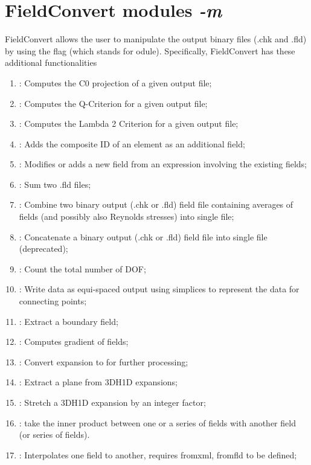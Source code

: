 \section{FieldConvert modules \textit{-m}}
FieldConvert allows the user to manipulate the \nekpp output
binary files (.chk and .fld) by using the flag  (which
stands for odule).
Specifically, FieldConvert has these additional functionalities
%
\begin{enumerate}
\item {}: Computes the C0 projection of a given output file;
\item {}: Computes the Q-Criterion for a given output file;
\item {}: Computes the Lambda 2 Criterion for a given output file;
\item {}: Adds the composite ID of an element as an additional field;
\item {}: Modifies or adds a new field from an expression involving the existing fields;
\item {}: Sum two .fld files;
\item {}: Combine two \nekpp binary output (.chk or .fld) field file containing averages of fields (and
possibly also Reynolds stresses) into single file;
\item {}: Concatenate a \nekpp binary output (.chk or .fld) field file into single file (deprecated);
\item {}: Count the total number of DOF;
\item {}: Write data as equi-spaced output using simplices to represent the data for connecting points;
\item {}: Extract a boundary field;
\item {}: Computes gradient of fields;
\item {}: Convert  expansion to  for further processing;
\item {}: Extract a plane from 3DH1D expansions;
\item {}: Stretch a 3DH1D expansion by an integer factor;
\item {}: take the inner product between one or a series of fields with another field (or series of fields).
\item {}: Interpolates one field to another, requires fromxml, fromfld to be defined;

\end{enumerate}
